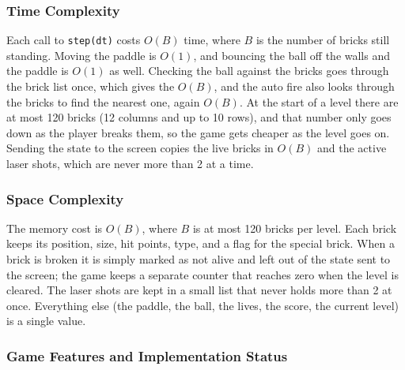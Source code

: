 \documentclass[12pt,letterpaper]{article}
\begin{document}
\subsubsection{Time Complexity}

Each call to \texttt{step(dt)} costs $O(B)$ time, where $B$ is the number of bricks still standing. Moving the paddle is $O(1)$, and bouncing the ball off the walls and the paddle is $O(1)$ as well. Checking the ball against the bricks goes through the brick list once, which gives the $O(B)$, and the auto fire also looks through the bricks to find the nearest one, again $O(B)$. At the start of a level there are at most 120 bricks (12 columns and up to 10 rows), and that number only goes down as the player breaks them, so the game gets cheaper as the level goes on. Sending the state to the screen copies the live bricks in $O(B)$ and the active laser shots, which are never more than 2 at a time.

\subsubsection{Space Complexity}

The memory cost is $O(B)$, where $B$ is at most 120 bricks per level. Each brick keeps its position, size, hit points, type, and a flag for the special brick. When a brick is broken it is simply marked as not alive and left out of the state sent to the screen; the game keeps a separate counter that reaches zero when the level is cleared. The laser shots are kept in a small list that never holds more than 2 at once. Everything else (the paddle, the ball, the lives, the score, the current level) is a single value.

\subsubsection{Game Features and Implementation Status}
\end{document}

